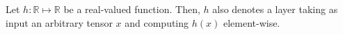 




\begin{definition}
  Let $h : \mathbb{R} \mapsto \mathbb{R}$ be a real-valued function.
  Then, $h$ also denotes a layer taking as input an arbitrary tensor $x$
  and computing $h(x)$ element-wise.
\end{definition}

